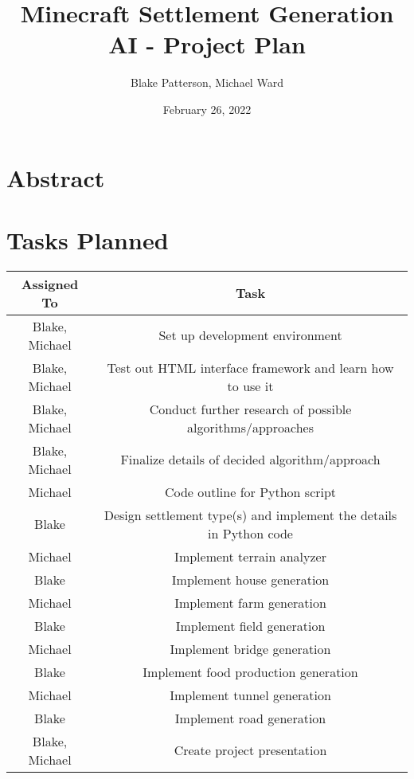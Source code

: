 \documentclass[11pt, oneside]{article}
\begin{document}
\title{Minecraft Settlement Generation AI - Project Plan}
\author{Blake Patterson, Michael Ward}
\date{February 26, 2022}
\maketitle

\newpage
\tableofcontents
\newpage
{}


\section{Abstract}
\label{abstract}

\newpage


\section{Tasks Planned}
\label{tasksPlanned}

\begin{center}
\begin{tabular}{| c | c |} 
 	\hline
 	 Assigned To & Task \\ [0.5ex] 
 	\hline\hline
	Blake, Michael & Set up development environment \\
	\hline
	Blake, Michael & Test out HTML interface framework and learn how to use it \\
	\hline
	Blake, Michael & Conduct further research of possible algorithms/approaches \\
	\hline
	Blake, Michael & Finalize details of decided algorithm/approach \\
	\hline
	Michael & Code outline for Python script \\
	\hline
	Blake & Design settlement type(s) and implement the details in Python code \\
	\hline
	Michael & Implement terrain analyzer \\
	\hline
	Blake & Implement house generation \\
	\hline
	Michael & Implement farm generation \\
	\hline
	Blake & Implement field generation \\
	\hline
	Michael & Implement bridge generation \\
	\hline
	Blake & Implement food production generation \\
	\hline
	Michael & Implement tunnel generation \\
	\hline
	Blake & Implement road generation \\
	\hline
	Blake, Michael & Create project presentation \\
	\hline
\end{tabular}
\end{center}
\end{document}
